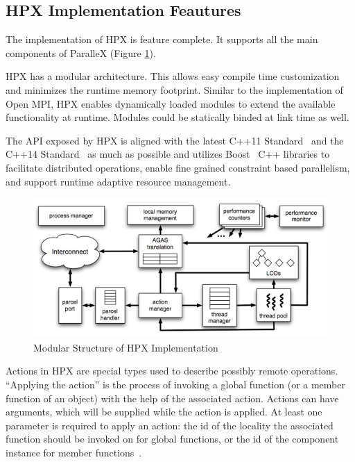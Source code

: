 \subsection{HPX Implementation Feautures}

The implementation of HPX is feature complete. It supports all the main components of ParalleX (Figure \ref{fig:hpx-structure}).

HPX has a modular architecture. This allows easy compile time customization and minimizes the runtime memory footprint. Similar to the implementation of Open MPI, HPX enables dynamically loaded modules to extend the available functionality at runtime. Modules could be statically binded at link time as well.

The API exposed by HPX is aligned with the latest C++11 Standard~\cite{c++11} and the C++14 Standard~\cite{c++14} as much as possible and utilizes Boost~\cite{dawes2009boost} C++ libraries to facilitate distributed operations, enable fine grained constraint based parallelism, and support runtime adaptive resource management\cite{kaiser2014hpx}.

\begin{figure}[h!]
\centering
\includegraphics[scale=0.5]{images/hpx.png}
\caption[Modular Structure of HPX Implementation]{Modular Structure of HPX Implementation~\cite{anderson2013tabulated}}
\label{fig:hpx-structure}
\end{figure}

Actions in HPX are special types used to describe possibly remote operations. ``Applying the action'' is the process of invoking a global function (or a member function of an object) with the help of the associated action. Actions can have arguments, which will be supplied while the action is applied. At least one parameter is required to apply an action: the id of the locality the associated function should be invoked on for global functions, or the id of the component instance for member functions~\cite{ghimire2014data}.

